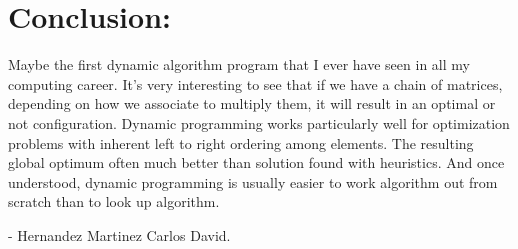 \section{Conclusion:}

Maybe the first dynamic algorithm program that I ever have seen in all my computing career. It's very interesting to see that if we have a chain of matrices, depending on how we associate to multiply them, it will result in an optimal or not configuration. Dynamic programming works particularly well for optimization problems with inherent left to right ordering among elements. The resulting global optimum often much better than solution found with heuristics. And once understood, dynamic programming is usually easier to work algorithm out from scratch than to look up algorithm. 

\begin{flushright}
- Hernandez Martinez Carlos David.
\end{flushright} \hfill \break


\pagebreak